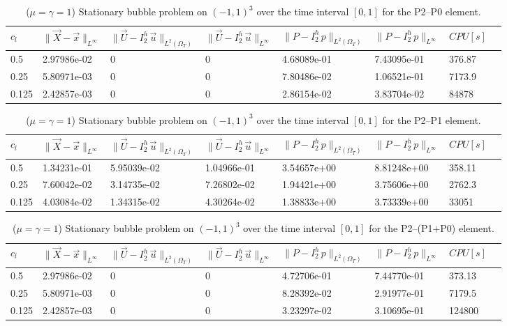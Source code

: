 \documentclass[a4paper,12pt,onecolumn]{article}
\newcommand{\errorXx}{\|\vec{X} - \vec{x}\|_{L^\infty}}
\newcommand{\LerrorUu}[1]{\|\vec U - I^h_{#1}\,\vec u\|_{L^2(\Omega_T)}}
\newcommand{\errorUu}[1]{\|\vec U - I^h_{#1}\,\vec u\|_{L^\infty}}
\newcommand{\errorPp}[1]{\|P - I^h_{#1}\,p\|_{L^\infty}}
\newcommand{\LerrorPp}[1]{\|P - I^h_{#1}\,p\|_{L^2(\Omega_T)}}
\begin{document}
\begin{table}
 \center
 \hspace*{-2cm}
\begin{tabular}{llllllll}
\hline
$c_l$ & $\errorXx$ & $\LerrorUu2$ & $\errorUu2$ & $\LerrorPp2$ & $\errorPp2$ & $CPU[s]$ \\
\hline
0.5 & 2.97986e-02 & 0 & 0 & 4.68089e-01 & 7.43095e-01 & 376.87\\
0.25 & 5.80971e-03 & 0 & 0 & 7.80486e-02 & 1.06521e-01 & 7173.9\\
0.125 & 2.42857e-03 & 0 & 0 & 2.86154e-02 & 3.83704e-02 & 84878 \\
\hline
\end{tabular}
\hspace*{-2cm}
\caption{($\mu=\gamma=1$) Stationary bubble problem on $(-1,1)^3$ over the time interval $[0,1]$ for the P2--P0 element.}
\label{tab:bubble3Dp2p0}
\end{table}

\begin{table}
 \center
 \hspace*{-2cm}
\begin{tabular}{llllllll}
\hline
$c_l$ & $\errorXx$ & $\LerrorUu2$ & $\errorUu2$ & $\LerrorPp2$ & $\errorPp2$ & $CPU[s]$ \\
\hline
0.5 & 1.34231e-01 & 5.95039e-02 & 1.04966e-01 & 3.54657e+00 & 8.81248e+00 & 358.11\\
0.25 & 7.60042e-02 & 3.14735e-02 & 7.26802e-02 & 1.94421e+00 & 3.75606e+00 & 2762.3\\
0.125 & 4.03084e-02 & 1.34315e-02 & 4.30264e-02 & 1.38833e+00 & 3.73339e+00 & 33051\\
\hline
\end{tabular}
\hspace*{-2cm}
\caption{($\mu=\gamma=1$) Stationary bubble problem on $(-1,1)^3$ over the time interval $[0,1]$ for the P2--P1 element.}
\label{tab:bubble3Dp2p1}
\end{table}

\begin{table}
 \center
 \hspace*{-2cm}
\begin{tabular}{llllllll}
\hline
$c_l$ & $\errorXx$ & $\LerrorUu2$ & $\errorUu2$ & $\LerrorPp2$ & $\errorPp2$ & $CPU[s]$ \\
\hline
0.5 & 2.97986e-02 & 0 & 0 & 4.72706e-01 & 7.44770e-01 & 373.13\\
0.25 & 5.80971e-03 & 0 & 0 & 8.28392e-02 & 2.91977e-01 & 7179.5\\
0.125 & 2.42857e-03 & 0 & 0 & 3.23297e-02 & 3.10695e-01 & 124800\\
\hline
\end{tabular}
\hspace*{-2cm}
\caption{($\mu=\gamma=1$) Stationary bubble problem on $(-1,1)^3$ over the time interval $[0,1]$ for the P2--(P1+P0) element.}
\label{tab:bubble3Dp2p1p0}
\end{table}
\end{document}
